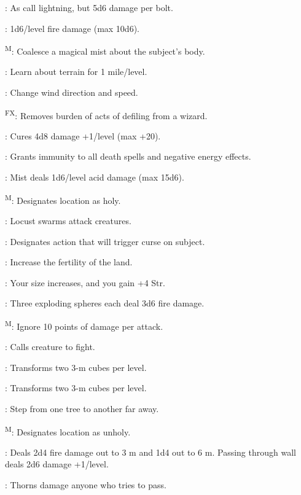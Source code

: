 : As call lightning, but 5d6 damage per bolt.

: 1d6/level fire damage (max 10d6).

\textsuperscript{M}: Coalesce a magical mist about the subject’s body.

: Learn about terrain for 1 mile/level.

: Change wind direction and speed.

\textsuperscript{FX}: Removes burden of acts of defiling from a wizard.

: Cures 4d8 damage +1/level (max +20).

: Grants immunity to all death spells and negative energy effects.

: Mist deals 1d6/level acid damage (max 15d6).

\textsuperscript{M}: Designates location as holy.

: Locust swarms attack creatures.

: Designates action that will trigger curse on subject.

: Increase the fertility of the land.

: Your size increases, and you gain +4 Str.

: Three exploding spheres each deal 3d6 fire damage.

\textsuperscript{M}: Ignore 10 points of damage per attack.

: Calls creature to fight.

: Transforms two 3-m cubes per level.

: Transforms two 3-m cubes per level.

: Step from one tree to another far away.

\textsuperscript{M}: Designates location as unholy.

: Deals 2d4 fire damage out to 3 m and 1d4 out to 6 m. Passing through wall deals 2d6 damage +1/level.

: Thorns damage anyone who tries to pass.



